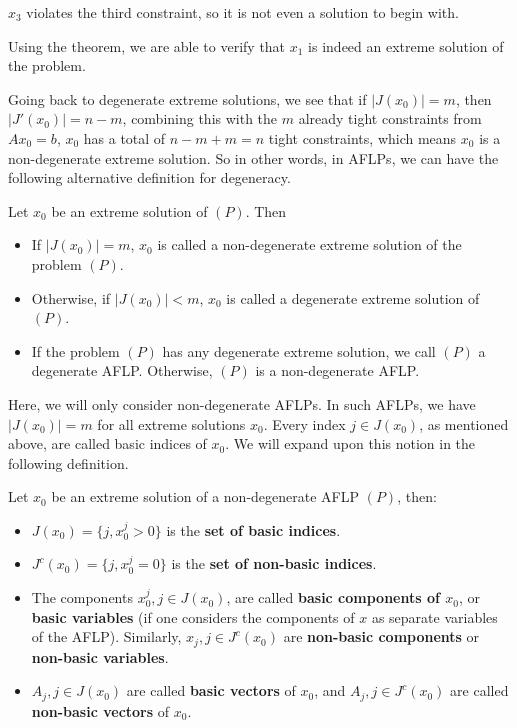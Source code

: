   \( x_{3} \) violates the third constraint, so it is not even a solution to
  begin with.

  Using the theorem, we are able to verify that \( x_{1} \) is indeed an extreme
  solution of the problem.

Going back to degenerate extreme solutions, we see that if \( |J(x_{0})| = m \),
then \( |J'(x_{0})| = n - m \), combining this with the \( m \) already tight
constraints from \( Ax_{0} = b \), \( x_{0} \) has a total of \( n - m + m = n
\) tight constraints, which means \( x_{0} \) is a non-degenerate extreme
solution. So in other words, in AFLPs, we can have the following alternative
definition for degeneracy.

\begin{definition}
\label{def:Degeneracy of AFLPs}
  Let \( x_{0} \) be an extreme solution of \( (P) \). Then
  \begin{itemize}
  \item If \( |J(x_{0})| = m \), \( x_{0} \) is called a non-degenerate extreme
    solution of the problem \( (P) \).
  \item Otherwise, if \( |J(x_{0})| < m \), \( x_{0} \) is called a degenerate
    extreme solution of \( (P) \).
  \item If the problem \( (P) \) has any degenerate extreme solution, we call \(
    (P)\) a degenerate AFLP. Otherwise, \( (P) \) is a non-degenerate AFLP.
  \end{itemize}
\end{definition}

Here, we will only consider non-degenerate AFLPs. In such AFLPs, we have \(
|J(x_{0})| = m \) for all extreme solutions \( x_{0} \). Every index \( j \in
J(x_{0}) \), as mentioned above, are called basic indices of \( x_{0} \). We
will expand upon this notion in the following definition.

\begin{definition}
\label{def:Basic indices, components and vectors}
  Let \( x_{0} \) be an extreme solution of a non-degenerate AFLP \( (P) \),
  then:
  \begin{itemize}
  \item \( J(x_{0}) = \{j, x_{0}^{j} > 0\}   \) is the \textbf{set of basic
    indices}.
  \item \( J^{c}(x_{0}) = \{j, x_{0}^{j} = 0\}   \)  is the \textbf{set of
    non-basic indices}.
  \item The components \( x_{0}^{j}, j \in J(x_{0}) \), are called \textbf{basic
    components of \( x_{0} \)}, or \textbf{basic variables} (if one considers
    the components of \( x \) as separate variables of the AFLP). Similarly, \(
    x_{j}, j \in J^{c}(x_{0})\) are \textbf{non-basic components} or
    \textbf{non-basic variables}.
  \item \( A_{j}, j \in J(x_{0}) \) are called \textbf{basic vectors} of \(
    x_{0} \), and \( A_{j}, j \in J^{c}(x_{0}) \) are called \textbf{non-basic
    vectors} of \( x_{0} \).
  \end{itemize}
\end{definition}

